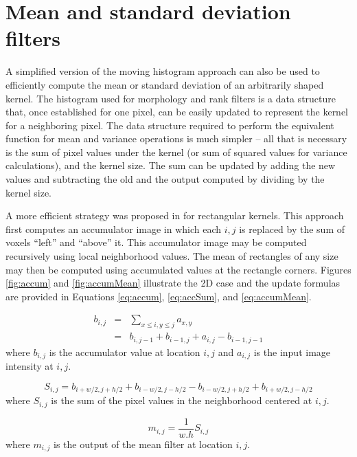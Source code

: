 \documentclass{InsightArticle}
\begin{document}
\section{Mean and standard deviation filters}
\label{sect:meanVar}
A simplified version of the moving histogram approach can also be used
to efficiently compute the mean or standard deviation of an arbitrarily shaped
kernel. The histogram used for morphology and rank filters is a data
structure that, once established for one pixel, can be easily updated
to represent the kernel for a neighboring pixel. The data structure
required to perform the equivalent function for mean and variance
operations is much simpler -- all that is necessary is the sum of
pixel values under the kernel (or sum of squared values for variance
calculations), and the kernel size. The sum can be updated by adding
the new values and subtracting the old and the output computed by
dividing by the kernel size.

A more efficient strategy was proposed in \cite{Crow84} for
rectangular kernels. This approach first computes an accumulator image
in which each $i,j$ is replaced by the sum of voxels ``left'' and
``above'' it. This accumulator image may be computed recursively using
local neighborhood values. The mean of rectangles of any size may then
be computed using accumulated values at the rectangle corners. Figures
\ref{fig:accum} and \ref{fig:accumMean} illustrate the 2D case and the
update formulas are provided in Equations \ref{eq:accum}, \ref{eq:accSum}, and
\ref{eq:accumMean}.

\begin{eqnarray}
\label{eq:accum}
b_{i,j} & = & \sum_{x \leq i, y \leq j} a_{x,y} \\ \nonumber
	& = & b_{i,j-1} + b_{i-1, j} + a_{i,j} - b_{i-1, j-1}
\end{eqnarray}
where $b_{i,j}$ is the accumulator value at location $i,j$ and $a_{i,j}$ is the input image intensity at $i,j$.

\begin{equation}
\label{eq:accSum}
S_{i,j} = b_{i+w/2,j+h/2} + b_{i-w/2,j-h/2} - b_{i-w/2,j+h/2} + b_{i+w/2,j-h/2}
\end{equation}
where $S_{i,j}$ is the sum of the pixel values in the neighborhood centered at $i,j$.

\begin{equation}
\label{eq:accumMean}
m_{i,j} = \frac{1}{w.h}S_{i,j}
\end{equation}
where $m_{i,j}$ is the output of the mean filter at location $i,j$.
\end{document}
